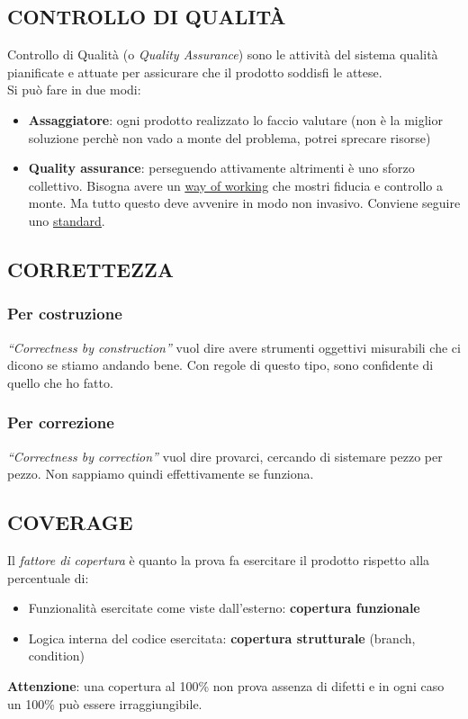 		\subsection{CONTROLLO DI QUALITÀ}		\label{controlloqualita} %
		Controllo di Qualità (o \textit{Quality Assurance}) sono le attività del sistema qualità pianificate e attuate per assicurare che il prodotto soddisfi le attese. \\
		Si può fare in due modi:
		\begin{itemize}
			\item \textbf{Assaggiatore}: ogni prodotto realizzato lo faccio valutare (non è la miglior soluzione perchè non vado a monte del problema, potrei sprecare risorse)
			\item \textbf{Quality assurance}: perseguendo attivamente altrimenti è uno sforzo collettivo. Bisogna avere un \underline{\hyperref[way]{way of working}} che mostri fiducia e controllo a monte. Ma tutto questo deve avvenire in modo non invasivo. Conviene seguire uno \underline{\hyperref[standard]{standard}}.
		\end{itemize}


		\subsection{CORRETTEZZA}	 \label{correttezza}
			\subsubsection{Per costruzione}	\label{byconstruction}
			\textit{``Correctness by construction''} vuol dire avere strumenti oggettivi misurabili che ci dicono se stiamo andando bene. Con regole di questo tipo, sono confidente di quello che ho fatto.
			\subsubsection{Per correzione} \label{bycorrection}
			\textit{``Correctness by correction''} vuol dire provarci, cercando di sistemare pezzo per pezzo. Non sappiamo quindi effettivamente se funziona.


		\subsection{COVERAGE}		\label{coverage}
		Il \textit{fattore di copertura} è quanto la prova fa esercitare il prodotto rispetto alla percentuale di:
		\begin{itemize}
			\item Funzionalità esercitate come viste dall'esterno: \textbf{copertura funzionale}
			\item Logica interna del codice esercitata: \textbf{copertura strutturale} (branch, condition)
		\end{itemize}
		\textbf{Attenzione}: una copertura al 100\% non prova assenza di difetti e in ogni caso un 100\% può essere irraggiungibile.


